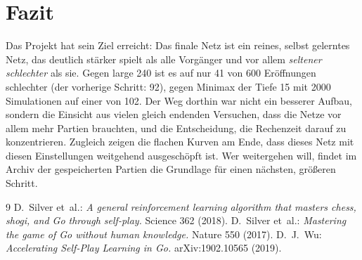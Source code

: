 \documentclass[11pt,a4paper]{article}
\begin{document}
\section{Fazit}

Das Projekt hat sein Ziel erreicht: Das finale Netz ist ein reines, selbst gelerntes Netz, das deutlich
stärker spielt als alle Vorgänger und vor allem \emph{seltener schlechter} als sie. Gegen large 240 ist es
auf nur 41 von 600 Eröffnungen schlechter (der vorherige Schritt: 92), gegen Minimax der Tiefe 15 mit
2000 Simulationen auf einer von 102. Der Weg dorthin war nicht ein besserer Aufbau, sondern die Einsicht
aus vielen gleich endenden Versuchen, dass die Netze vor allem mehr Partien brauchten, und die
Entscheidung, die Rechenzeit darauf zu konzentrieren. Zugleich zeigen die flachen Kurven am Ende, dass
dieses Netz mit diesen Einstellungen weitgehend ausgeschöpft ist. Wer weitergehen will, findet im Archiv
der gespeicherten Partien die Grundlage für einen nächsten, größeren Schritt.

\begin{thebibliography}{9}
 D.~Silver et~al.: \emph{A general reinforcement learning algorithm that masters chess,
shogi, and Go through self-play.} Science 362 (2018).
 D.~Silver et~al.: \emph{Mastering the game of Go without human knowledge.} Nature 550
(2017).
 D.~J.~Wu: \emph{Accelerating Self-Play Learning in Go.} arXiv:1902.10565 (2019).
\end{thebibliography}
\end{document}
